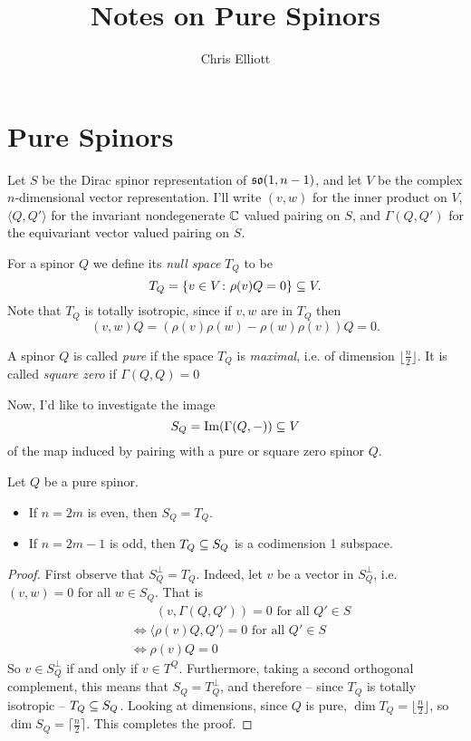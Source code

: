 \documentclass[10pt, oneside]{article}
\title{Notes on Pure Spinors}
\author{Chris Elliott}
\date{}
\begin{document}
\maketitle

\section{Pure Spinors}
Let $S$ be the Dirac spinor representation of $\mathfrak{so}(1,n-1)$, and let $V$ be the complex $n$-dimensional vector representation.  I'll write $(v,w)$ for the inner product on $V$, $\langle Q, Q' \rangle$ for the invariant nondegenerate $\mathbb{C}$ valued pairing on $S$, and $\Gamma(Q, Q')$ for the equivariant vector valued pairing on $S$. 

For a spinor $Q$ we define its \emph{null space} $T_Q$ to be 
\[T_Q = \{v \in V \colon \rho(v)Q = 0\} \subseteq V.\]
Note that $T_Q$ is totally isotropic, since if $v, w$ are in $T_Q$ then
\[(v,w)Q = (\rho(v)\rho(w) - \rho(w)\rho(v))Q = 0.\]

\begin{definition}
A spinor $Q$ is called \emph{pure} if the space $T_Q$ is \emph{maximal}, i.e. of dimension $\lfloor \frac n2 \rfloor$.  It is called \emph{square zero} if $\Gamma(Q,Q) = 0$
\end{definition}

Now, I'd like to investigate the image 
\[S_Q = \mathrm{Im}(\Gamma(Q,-)) \subseteq V\]
of the map induced by pairing with a pure or square zero spinor $Q$.
\begin{prop}
Let $Q$ be a pure spinor.
\vspace{-6pt}
\begin{itemize}
 \item If $n=2m$ is even, then $S_Q = T_Q$.
 \item If $n=2m-1$ is odd, then $T_Q \subseteq S_Q$ is a codimension 1 subspace.
\end{itemize}
\vspace{-6pt}
\end{prop}

\begin{proof}
First observe that $S_Q^\perp = T_Q$.  Indeed, let $v$ be a vector in $S_Q^\perp$, i.e. $(v, w) = 0$ for all $w \in S_Q$.  That is
\begin{align*}
&\qquad (v, \Gamma(Q,Q')) = 0 \text{ for all } Q' \in S \\
&\Leftrightarrow \langle \rho(v)Q, Q' \rangle  = 0 \text{ for all } Q' \in S \\
&\Leftrightarrow \rho(v)Q = 0 
\end{align*}
So $v \in S_Q^\perp$ if and only if $v \in T^Q$.  Furthermore, taking a second orthogonal complement, this means that $S_Q = T_Q^\perp$, and therefore -- since $T_Q$ is totally isotropic -- $T_Q \subseteq S_Q$.  Looking at dimensions, since $Q$ is pure, $\dim T_Q = \lfloor \frac n2 \rfloor$, so $\dim  S_Q = \lceil \frac n2 \rceil$.  This completes the proof.
\end{proof}
\end{document}

